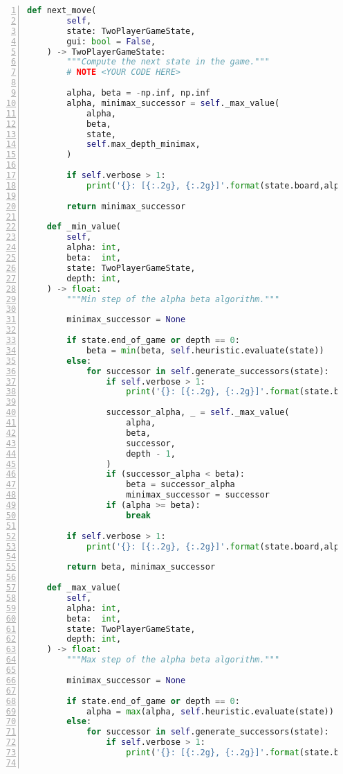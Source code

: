 \documentclass{article}
\begin{document}
\begin{lstlisting}[language=python, caption = Implementation of the alpha beta pruning algorithm,captionpos=t,numbers=left]
    def next_move(
        self,
        state: TwoPlayerGameState,
        gui: bool = False,
    ) -> TwoPlayerGameState:
        """Compute the next state in the game."""
        # NOTE <YOUR CODE HERE>

        alpha, beta = -np.inf, np.inf
        alpha, minimax_successor = self._max_value(
            alpha, 
            beta,
            state,
            self.max_depth_minimax,
        )

        if self.verbose > 1:
            print('{}: [{:.2g}, {:.2g}]'.format(state.board,alpha,beta))

        return minimax_successor
    
    def _min_value(
        self,
        alpha: int,
        beta:  int,
        state: TwoPlayerGameState,
        depth: int,
    ) -> float:
        """Min step of the alpha beta algorithm."""

        minimax_successor = None

        if state.end_of_game or depth == 0:
            beta = min(beta, self.heuristic.evaluate(state))
        else:
            for successor in self.generate_successors(state):
                if self.verbose > 1:
                    print('{}: [{:.2g}, {:.2g}]'.format(state.board,alpha,beta))

                successor_alpha, _ = self._max_value(
                    alpha,
                    beta,
                    successor,
                    depth - 1,
                )
                if (successor_alpha < beta):
                    beta = successor_alpha
                    minimax_successor = successor
                if (alpha >= beta):
                    break

        if self.verbose > 1:
            print('{}: [{:.2g}, {:.2g}]'.format(state.board,alpha,beta))

        return beta, minimax_successor

    def _max_value(
        self,
        alpha: int,
        beta:  int,
        state: TwoPlayerGameState,
        depth: int,
    ) -> float:
        """Max step of the alpha beta algorithm."""

        minimax_successor = None

        if state.end_of_game or depth == 0:
            alpha = max(alpha, self.heuristic.evaluate(state))
        else:
            for successor in self.generate_successors(state):
                if self.verbose > 1:
                    print('{}: [{:.2g}, {:.2g}]'.format(state.board,alpha,beta))


\end{lstlisting}
\end{document}
